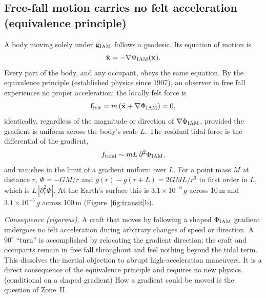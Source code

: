 \subsection{Free-fall motion carries no felt acceleration (equivalence principle)}\label{sec:ge_freefall}
A body moving solely under $\mathbf g_{\rm IAM}$ follows a geodesic. Its equation of motion is
\begin{equation}
\ddot{\mathbf x}=-\nabla\Phi_{\rm IAM}(\mathbf x).
\label{eq:ge_eom}
\end{equation}
Every part of the body, and any occupant, obeys the same equation. By the equivalence principle (established physics since 1907), an observer in free
fall experiences no proper acceleration: the locally felt force is
\begin{equation}
\mathbf f_{\rm felt}=m\left(\ddot{\mathbf x}+\nabla\Phi_{\rm IAM}\right)=0,
\label{eq:ge_felt}
\end{equation}
identically, regardless of the magnitude or direction of $\nabla\Phi_{\rm IAM}$, provided the gradient is uniform across the body's scale $L$.
\derived{} The residual tidal force is the differential of the gradient,
\begin{equation}
f_{\rm tidal}\sim mL\,\partial^2\Phi_{\rm IAM},
\label{eq:ge_tidal}
\end{equation}
and vanishes in the limit of a gradient uniform over $L$. For a point mass $M$ at distance $r$, $\Phi=-GM/r$ and $g(r)-g(r+L)=2GML/r^3$ to first
order in $L$, which is $L\,|\partial_r^2\Phi|$. \derived{} At the Earth's surface this is $3.1\times10^{-6}\,g$ across 10\,m and
$3.1\times10^{-5}\,g$ across 100\,m (Figure~\ref{fig:transit}b). \calc

\emph{Consequence (rigorous).} A craft that moves by following a shaped $\Phi_{\rm IAM}$ gradient undergoes no felt acceleration during arbitrary
changes of speed or direction. A $90^\circ$ ``turn'' is accomplished by relocating the gradient direction; the craft and occupants remain in free fall
throughout and feel nothing beyond the tidal term. This dissolves the inertial objection to abrupt high-acceleration maneuvers. It is a direct
consequence of the equivalence principle and requires no new physics. \derived{} (conditional on a shaped gradient) How a gradient could be moved is the question of Zone~II.

